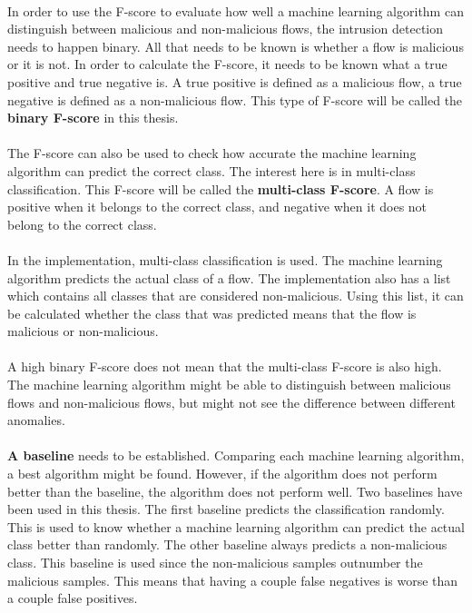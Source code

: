 \\
In order to use the F-score to evaluate how well a machine learning algorithm can distinguish between malicious and non-malicious flows, the intrusion detection needs to happen binary. All that needs to be known is whether a flow is malicious or it is not. In order to calculate the F-score, it needs to be known what a true positive and true negative is. A true positive is defined as a malicious flow, a true negative is defined as a non-malicious flow. This type of F-score will be called the \textbf{binary F-score} in this thesis.\\
\\
The F-score can also be used to check how accurate the machine learning algorithm can predict the correct class. The interest here is in multi-class classification. This F-score will be called the \textbf{multi-class F-score}. A flow is positive when it belongs to the correct class, and negative when it does not belong to the correct class.\\
\\
In the implementation, multi-class classification is used. The machine learning algorithm predicts the actual class of a flow. The implementation also has a list which contains all classes that are considered non-malicious. Using this list, it can be calculated whether the class that was predicted means that the flow is malicious or non-malicious. \\
\\ 
A high binary F-score does not mean that the multi-class F-score is also high. The machine learning algorithm might be able to distinguish between malicious flows and non-malicious flows, but might not see the difference between different anomalies.\\
\\
\textbf{A baseline} needs to be established. Comparing each machine learning algorithm, a best algorithm might be found. However, if the algorithm does not perform better than the baseline, the algorithm does not perform well. Two baselines have been used in this thesis. The first baseline predicts the classification randomly. This is used to know whether a machine learning algorithm can predict the actual class better than randomly. The other baseline always predicts a non-malicious class. This baseline is used since the non-malicious samples outnumber the malicious samples. This means that having a couple false negatives is worse than a couple false positives. \\
\\

